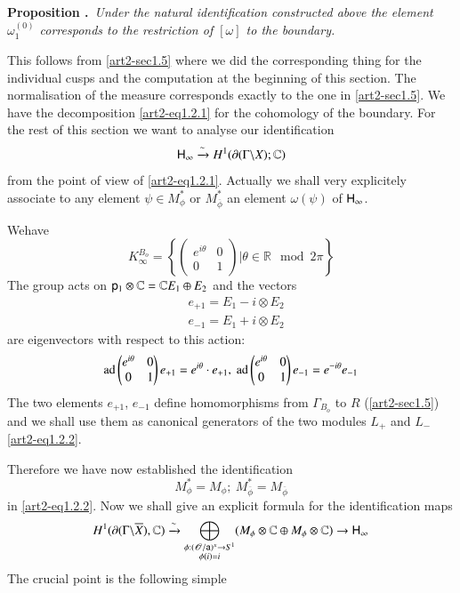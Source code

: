 \medskip
\noindent
{\bf Proposition .\label{art2-prop1.6.1}}~{\em Under the natural identification constructed above the element $\omega^{(0)}_{1}$ corresponds to the restriction of $[\omega]$ to the boundary.}
\smallskip

This follows from \ref{art2-sec1.5} where we did the corresponding thing for the individual cusps and the computation at the beginning of this section. The normalisation of the measure corresponds exactly to the one in \ref{art2-sec1.5}. We have the decomposition \eqref{art2-eq1.2.1} for the cohomology of the boundary. For the rest of this section we want to analyse our identification
$$
\mathsf{H}_{\infty}\xrightarrow{\sim}H^{1}(\partial(\Gamma\backslash X);\mathbb{C})
$$
from the point of view of \eqref{art2-eq1.2.1}. Actually we shall very explicitely associate to any element $\psi\in M^{*}_{\phi}$ or $M^{*}_{\overline{\phi}}$ an element $\omega(\psi)$ of $\mathsf{H}_{\infty}$.

We\pageoriginale have
$$
K^{B_{o}}_{\infty}=\left\{\left(
\begin{matrix}
e^{i\theta} & 0\\
0 & 1
\end{matrix}
\right)\Big| \theta\in \mathbb{R}\mod 2\pi\right\}
$$
The group acts on $\mathsf{p}_{1}\otimes \mathbb{C}=\mathbb{C}E_{1}\oplus E_{2}$ and the vectors
\begin{align*}
& e_{+1}=E_{1}-i\otimes E_{2}\\
& e_{-1}=E_{1}+i\otimes E_{2}
\end{align*}
are eigenvectors with respect to this action:
$$
\ad \left(\begin{matrix} e^{i\theta} & 0\\ 0 & 1\end{matrix}\right)e_{+1}=e^{i\theta}\cdot e_{+1}, \ \ad\left(\begin{matrix} e^{i\theta} & 0\\ 0 & 1\end{matrix}\right)e_{-1}=e^{-i\theta}e_{-1}
$$
The two elements $e_{+1}$, $e_{-1}$ define homomorphisms from $\Gamma_{B_{o}}$ to $R$ (\ref{art2-sec1.5}) and we shall use them as canonical generators of the two modules $L_{+}$ and $L_{-}$ \eqref{art2-eq1.2.2}.

Therefore we have now established the identification
$$
M^{*}_{\phi}=M_{\phi}; \ M^{*}_{\overline{\phi}}=M_{\overline{\phi}}
$$
in \ref{art2-eq1.2.2}. Now we shall give an explicit formula for the identification maps
$$
H^{1}(\partial (\Gamma\backslash \overline{X}),\mathbb{C})\xrightarrow{\sim}\bigoplus\limits_{\substack{\phi:(\mathscr{O}/\mathsf{a})^{x}\to S^{1}\\ \phi(i)=i}}(M_{\phi}\otimes \mathbb{C}\oplus M_{\phi}\otimes \mathbb{C})\to \mathsf{H}_{\infty}
$$
The crucial point is the following simple

